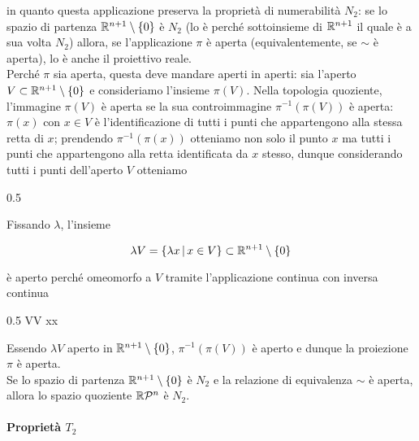 in quanto questa applicazione preserva la proprietà di numerabilità $ N_{2} $: se lo spazio di partenza $ \mathbb{R}^{n+1} \setminus \{0\} $ è $ N_{2} $ (lo è perché sottoinsieme di $ \mathbb{R}^{n+1} $ il quale è a sua volta $ N_{2} $) allora, se l'applicazione $ \pi $ è aperta (equivalentemente, se $ \sim $ è aperta), lo è anche il proiettivo reale. \\
Perché $ \pi $ sia aperta, questa deve mandare aperti in aperti: sia l'aperto $ V \subset \mathbb{R}^{n+1} \setminus \{0\} $ e consideriamo l'insieme $ \pi(V) $. Nella topologia quoziente, l'immagine $ \pi(V) $ è aperta se la sua controimmagine $ \pi^{-1}(\pi(V)) $ è aperta: $ \pi(x) $ con $ x \in V $ è l'identificazione di tutti i punti che appartengono alla stessa retta di $ x $; prendendo $ \pi^{-1}(\pi(x)) $ otteniamo non solo il punto $ x $ ma tutti i punti che appartengono alla retta identificata da $ x $ stesso, dunque considerando tutti i punti dell'aperto $ V $ otteniamo

	{0.5}{%
			}




Fissando $ \lambda $, l'insieme

\begin{equation}
	\lambda V = \left\{ \lambda x \, \middle| \, x \in V \right\} \subset \mathbb{R}^{n+1} \setminus \{0\}
\end{equation}

è aperto perché omeomorfo a $ V $ tramite l'applicazione continua con inversa continua

	{0.5}{%
				{\lambda V}{V}
				{\lambda x}{x}
			}

Essendo $ \lambda V $ aperto in $ \mathbb{R}^{n+1} \setminus \{0\} $, $ \pi^{-1}(\pi(V)) $ è aperto e dunque la proiezione $ \pi $ è aperta. \\
Se lo spazio di partenza $ \mathbb{R}^{n+1} \setminus \{0\} $ è $ N_{2} $ e la relazione di equivalenza $ \sim $ è aperta, allora lo spazio quoziente $ \mathbb{R}\mathcal{P}^{n} $ è $ N_{2} $.

\paragraph{Proprietà $ T_{2} $}

